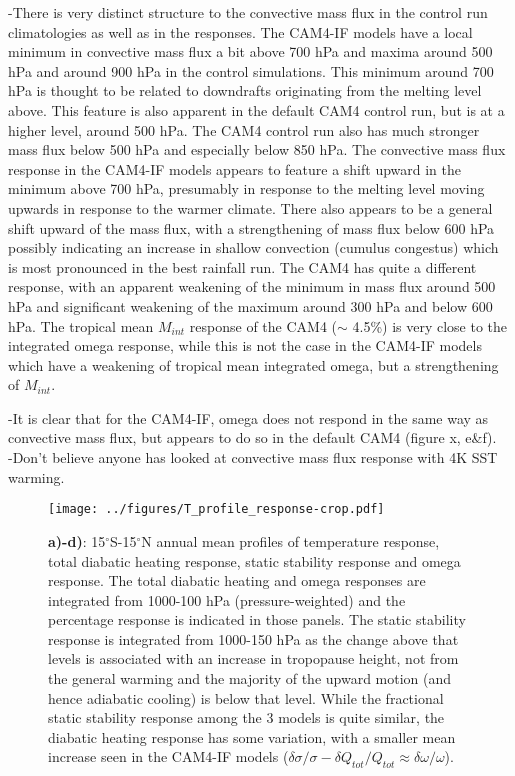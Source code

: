 \documentclass[letterpaper,12pt,titlepage,oneside,final]{book}
\begin{document}
-There is very distinct structure to the convective mass flux in the control run climatologies as well as in the responses. The CAM4-IF models have a local minimum in convective mass flux a bit above 700 hPa and maxima around 500 hPa and around 900 hPa in the control simulations. This minimum around 700 hPa is thought to be related to downdrafts originating from the melting level above. This feature is also apparent in the default CAM4 control run, but is at a higher level, around 500 hPa. The CAM4 control run also has much stronger mass flux below 500 hPa and especially below 850 hPa. The convective mass flux response in the CAM4-IF models appears to feature a shift upward in the minimum above 700 hPa, presumably in response to the melting level moving upwards in response to the warmer climate. There also appears to be a general shift upward of the mass flux, with a strengthening of mass flux below 600 hPa possibly indicating an increase in shallow convection (cumulus congestus) which is most pronounced in the best rainfall run. The CAM4 has quite a different response, with an apparent weakening of the minimum in mass flux around 500 hPa and significant weakening of the maximum around 300 hPa and below 600 hPa. The tropical mean $M_{int}$ response of the CAM4 ($\sim$ 4.5\%) is very close to the integrated omega response, while this is not the case in the CAM4-IF models which have a weakening of tropical mean integrated omega, but a strengthening of $M_{int}$.


-It is clear that for the CAM4-IF, omega does not respond in the same way as convective mass flux, but appears to do so in the default CAM4 (figure x, e\&f).
\\
-Don't believe anyone has looked at convective mass flux response with 4K SST warming.
\\


\begin{figure}[H]
\centering
\noindent\texttt{[image: ../figures/T\_profile\_response-crop.pdf]}\hfill
\caption{\textbf{a)-d)}: 15$^\circ$S-15$^\circ$N annual mean profiles of temperature response, total diabatic heating response, static stability response and omega response. The total diabatic heating and omega responses are integrated from 1000-100 hPa (pressure-weighted) and the percentage response is indicated in those panels. The static stability response is integrated from 1000-150 hPa as the change above that levels is associated with an increase in tropopause height, not from the general warming and the majority of the upward motion (and hence adiabatic cooling) is below that level. While the fractional static stability response among the 3 models is quite similar, the diabatic heating response has some variation, with a smaller mean increase seen in the CAM4-IF models ($\delta{\sigma}/\sigma - \delta{Q_{tot}}/Q_{tot} \approx \delta{\omega}/\omega$).}
\end{figure}
\end{document}
